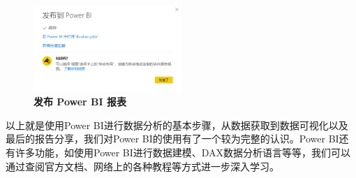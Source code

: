 \begin{figure}[htbp]
    \centering
    \includegraphics[width=0.5\textwidth]{figure/PowerBI/powerbi_publish.png}
    \caption{\textbf{发布 Power BI 报表}}
    \label{fig:powerbi_publish}
\end{figure}

以上就是使用Power BI进行数据分析的基本步骤，从数据获取到数据可视化以及最后的报告分享，我们对Power BI的使用有了一个较为完整的认识。Power BI还有许多功能，如使用Power BI进行数据建模、DAX数据分析语言等等，我们可以通过查阅官方文档、网络上的各种教程等方式进一步深入学习。